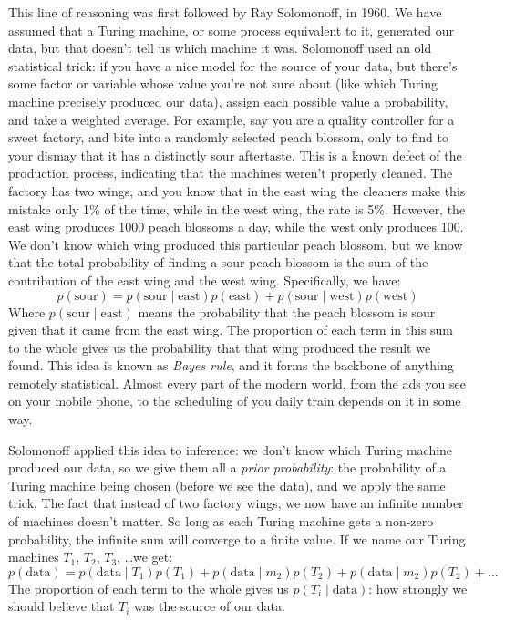 This line of reasoning was first followed by Ray Solomonoff, in 1960. We have assumed that a Turing machine, or some process equivalent to it, generated our data, but that doesn't tell us which machine it was. Solomonoff used an old statistical trick: if you have a nice model for the source of your data, but there's some factor or variable whose value you're not sure about (like which Turing machine precisely produced our data), assign each possible value a probability, and take a weighted average. For example, say you are a quality controller for a sweet factory, and bite into a randomly selected peach blossom, only to find to your dismay that it has a distinctly sour aftertaste. This is a known defect of the production process, indicating that the machines weren't properly cleaned. The factory has two wings, and you know that in the east wing the cleaners make this mistake only 1\% of the time, while in the west wing, the rate is 5\%. However, the east wing produces 1000 peach blossoms a day, while the west only produces 100. We don't know which wing produced this particular peach blossom, but we know that the total probability of finding a sour peach blossom is the sum of the contribution of the east wing and the west wing. Specifically, we have:
\[
p(\text{sour}) = p(\text{sour}\mid \text{east})p(\text{east}) + p(\text{sour}\mid \text{west})p(\text{west})  
\]
Where $p(\text{sour}\mid \text{east})$ means the probability that the peach blossom is sour given that it came from the east wing. The proportion of each term in this sum to the whole gives us the probability that that wing produced the result we found. This idea is known as \emph{Bayes rule}, and it forms the backbone of anything remotely statistical. Almost every part of the modern world, from the ads you see on your mobile phone, to the scheduling of you daily train depends on it in some way.    

 

Solomonoff applied this idea to inference: we don't know which Turing machine produced our data, so we give them all a \emph{prior probability}: the probability of a Turing machine being chosen (before we see the data), and we apply the same trick. The fact that instead of two factory wings, we now have an infinite number of machines doesn't matter. So long as each Turing machine gets a non-zero probability, the infinite sum will converge to a finite value. If we name our Turing machines $T_1$, $T_2$, $T_3$, \ldots we get:
\[
p(\text{data}) = p(\text{data} \mid T_1)p(T_1) + p(\text{data} \mid m_2)p(T_2) + p(\text{data} \mid m_2)p(T_2) + \ldots
\]
The proportion of each term to the whole gives us $p(T_i \mid \text{data})$: how strongly we should believe that $T_i$ was the source of our data.

